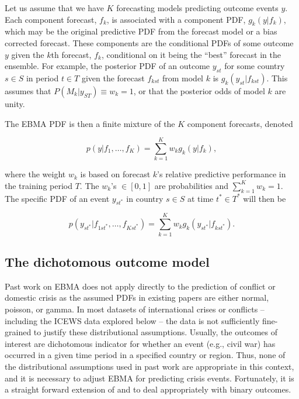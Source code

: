 \documentclass[pdftex,12pt,fullpage,oneside]{amsart}
\begin{document}
Let us assume that we have $K$ forecasting models predicting outcome
events $y$. Each component forecast, $f_k$, is associated with a
component PDF, $g_k(y|f_k)$, which may be the original predictive PDF
from the forecast model or a bias corrected forecast.  These
components are the conditional PDFs of some outcome $y$ given the
$k$th forecast, $f_k$, conditional on it being the ``best'' forecast
in the ensemble. For example, the posterior PDF of an outcome $y_{st}$
for some country $s \in S$ in period $t \in T$ given the forecast
$f_{kst}$ from model $k$ is $g_k(y_{st}|f_{kst})$. This assumes that
$P(M_k | y_{ST}) \equiv w_k=1$, or that the posterior odds of model
$k$ are unity.

The EBMA PDF is then a finite mixture of the $K$ component forecasts,
denoted

\begin{equation}
\label{BMA-eq}
p(y|f_1, \ldots, f_K)=\overset{K}{\underset{k=1}{\sum}} w_k
g_k(y|f_k),
\end{equation}
 
\noindent where the weight $w_k$ is based on forecast $k$'s relative
predictive performance in the training period $T$. The $w_k$'s $\in
[0,1]$ are probabilities and $\sum_{k=1}^Kw_k=1$.  The specific PDF of
\for an event $y_{st^*}$ in country $s\in S$ at time $t^* \in T^*$ will
then be

\begin{equation}
\label{BMA-eq2}
p(y_{st^*}|f_{1st^*}, \ldots,
f_{Kst^*})=\overset{K}{\underset{k=1}{\sum}} w_k
g_k(y_{st^*}|f_{kst^*}).
\end{equation}



\subsection{The dichotomous outcome model}

Past work on EBMA does not apply directly to the prediction of
conflict or domestic crisis as the assumed PDFs in existing papers are
either normal, poisson, or gamma. In most datasets of international
crises or conflicts -- including the ICEWS data explored below -- the
data is not sufficiently fine-grained to justify these distributional
assumptions.  Usually, the outcomes of interest are dichotomous
indicator for whether an event (e.g., civil war) has occurred in a
given time period in a specified country or region. Thus, none of the
distributional assumptions used in past work are appropriate in this
context, and it is necessary to adjust EBMA for predicting crisis
events.  Fortunately, it is a straight forward extension of
\citet{Sloughter:2007} and \citet{Sloughter:2010} to deal
appropriately with binary outcomes.
\end{document}

